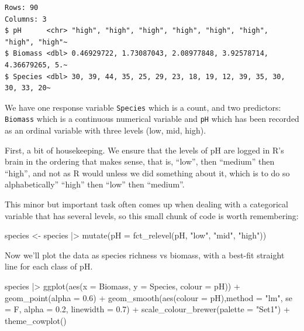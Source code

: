 \documentclass[
  letterpaper,
  DIV=11,
  numbers=noendperiod]{scrreprt}
\newenvironment{Shaded}{\begin{snugshade}}{\end{snugshade}}
\newcommand{\AttributeTok}[1]{\textcolor[rgb]{0.40,0.45,0.13}{#1}}
\newcommand{\FloatTok}[1]{\textcolor[rgb]{0.68,0.00,0.00}{#1}}
\newcommand{\FunctionTok}[1]{\textcolor[rgb]{0.28,0.35,0.67}{#1}}
\newcommand{\NormalTok}[1]{\textcolor[rgb]{0.00,0.23,0.31}{#1}}
\newcommand{\OtherTok}[1]{\textcolor[rgb]{0.00,0.23,0.31}{#1}}
\newcommand{\SpecialCharTok}[1]{\textcolor[rgb]{0.37,0.37,0.37}{#1}}
\newcommand{\StringTok}[1]{\textcolor[rgb]{0.13,0.47,0.30}{#1}}
\begin{document}
\begin{verbatim}
Rows: 90
Columns: 3
$ pH      <chr> "high", "high", "high", "high", "high", "high", "high", "high"~
$ Biomass <dbl> 0.46929722, 1.73087043, 2.08977848, 3.92578714, 4.36679265, 5.~
$ Species <dbl> 30, 39, 44, 35, 25, 29, 23, 18, 19, 12, 39, 35, 30, 30, 33, 20~
\end{verbatim}

We have one response variable \texttt{Species} which is a count, and two
predictors: \texttt{Biomass} which is a continuous numerical variable
and \texttt{pH} which has been recorded as an ordinal variable with
three levels (low, mid, high).

First, a bit of housekeeping. We ensure that the levels of pH are logged
in R's brain in the ordering that makes sense, that is, ``low'', then
``medium'' then ``high'', and not as R would unless we did something
about it, which is to do so alphabetically'' ``high'' then ``low'' then
``medium''.

This minor but important task often comes up when dealing with a
categorical variable that has several levels, so this small chunk of
code is worth remembering:

\begin{Shaded}
\begin{Highlighting}[]
\NormalTok{species }\OtherTok{\textless{}{-}}\NormalTok{ species }\SpecialCharTok{|\textgreater{}}
  \FunctionTok{mutate}\NormalTok{(}\AttributeTok{pH =} \FunctionTok{fct\_relevel}\NormalTok{(pH, }\StringTok{"low"}\NormalTok{, }\StringTok{"mid"}\NormalTok{, }\StringTok{"high"}\NormalTok{))}
\end{Highlighting}
\end{Shaded}

Now we'll plot the data as species richness vs biomass, with a best-fit
straight line for each class of pH.

\begin{Shaded}
\begin{Highlighting}[]
\NormalTok{species }\SpecialCharTok{|\textgreater{}}
  \FunctionTok{ggplot}\NormalTok{(}\FunctionTok{aes}\NormalTok{(}\AttributeTok{x =}\NormalTok{ Biomass, }\AttributeTok{y =}\NormalTok{ Species, }\AttributeTok{colour =}\NormalTok{ pH)) }\SpecialCharTok{+}
  \FunctionTok{geom\_point}\NormalTok{(}\AttributeTok{alpha =} \FloatTok{0.6}\NormalTok{) }\SpecialCharTok{+}
  \FunctionTok{geom\_smooth}\NormalTok{(}\FunctionTok{aes}\NormalTok{(}\AttributeTok{colour =}\NormalTok{ pH),}\AttributeTok{method =} \StringTok{"lm"}\NormalTok{, }\AttributeTok{se =}\NormalTok{ F, }\AttributeTok{alpha =} \FloatTok{0.2}\NormalTok{, }\AttributeTok{linewidth =} \FloatTok{0.7}\NormalTok{) }\SpecialCharTok{+}
  \FunctionTok{scale\_colour\_brewer}\NormalTok{(}\AttributeTok{palette =} \StringTok{"Set1"}\NormalTok{) }\SpecialCharTok{+}
  \FunctionTok{theme\_cowplot}\NormalTok{()}
\end{Highlighting}
\end{Shaded}
\end{document}
